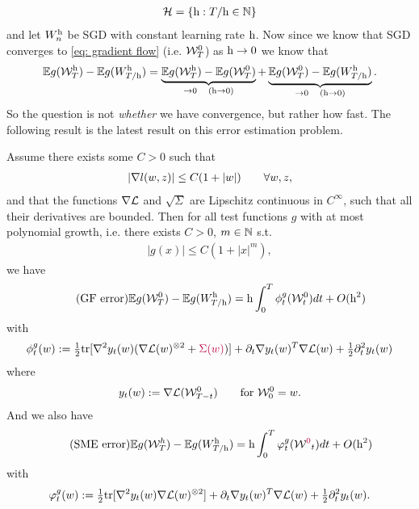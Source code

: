 \begin{align*}
	\mathcal{H} = \{\text{h} : T/\text{h} \in \mathbb{N}\}
\end{align*}
and let \(W_n^{\text{h}}\) be SGD with constant learning rate \(\text{h}\). Now
since we know that SGD converges to \ref{eq: gradient flow} (i.e.
\(\mathcal{W}^{0}_T\)) as \(\text{h}\to 0\) we know that 
\begin{align*}
	\mathbb{E} g(\mathcal{W}_T^{\text{h}}) - \mathbb{E} g(W^{\text{h}}_{T/\text{h}})
	= \underbrace{
		\mathbb{E} g(\mathcal{W}_T^{\text{h}}) - \mathbb{E} g(\mathcal{W}_T^0)
	}_{\to 0 \quad (\text{h}\to 0)}
	+ \underbrace{
		\mathbb{E} g(\mathcal{W}_T^0) - \mathbb{E} g(W^{\text{h}}_{T/\text{h}})
	}_{\to 0 \quad (\text{h}\to 0)}.
\end{align*}
So the question is not \emph{whether} we have convergence, but rather how fast.
The following result is the latest result on this error estimation problem.

\begin{theorem}
	Assume there exists some \(C>0\) such that
	\begin{align*}
		|\nabla l(w, z)| \le C(1+|w|)
		\qquad \forall w, z,
	\end{align*}
	and that the functions \(\nabla\mathcal{L}\) and \(\sqrt{\Sigma}\) are Lipschitz
	continuous in \(C^{\infty}\), such that all their derivatives are bounded.
	Then for all test functions \(g\) with at most polynomial growth, i.e. there
	exists \(C>0\), \(m\in\mathbb{N}\) s.t. 
	\begin{align*}
		|g(x)| \le C(1+|x|^m),
	\end{align*}
	we have
	\begin{align}
		\tag{GF error}
		\mathbb{E} g(\mathcal{W}^0_T) - \mathbb{E} g(W_{T/\text{h}}^{\text{h}})
		= \text{h} \int_0^T \phi_t^g(\mathcal{W}^0_t)dt + O(\text{h}^2)
	\end{align}
	with
	\begin{align*}
		\phi_t^g(w)
		:= \tfrac12 \text{tr}[
			\nabla^2 y_t(w)
			(\nabla\mathcal{L}(w)^{\otimes 2} + { \color{purple} \Sigma(w)})
		]
		+ \partial_t\nabla y_t(w)^T \nabla\mathcal{L}(w)
		+ \tfrac12 \partial_t^2 y_t(w)
	\end{align*}
	where
	\begin{align*}
		y_t(w) := \nabla\mathcal{L}(\mathcal{W}_{T-t}^0)
		\qquad \text{for } \mathcal{W}^0_0 = w.
	\end{align*}
	And we also have
	\begin{align}
		\tag{SME error}
		\mathbb{E} g(\mathcal{W}^h_T) - \mathbb{E} g(W_{T/\text{h}}^{\text{h}})
		= \text{h} \int_0^T \varphi_t^g(\mathcal{W}^{\color{purple}0}_t)dt + O(\text{h}^2)
	\end{align}
	with
	\begin{align*}
		\varphi_t^g(w)
		:= \tfrac12 \text{tr}[
			\nabla^2 y_t(w)\nabla\mathcal{L}(w)^{\otimes 2}
		]
		+ \partial_t\nabla y_t(w)^T \nabla\mathcal{L}(w)
		+ \tfrac12 \partial_t^2 y_t(w).
	\end{align*}
\end{theorem}

